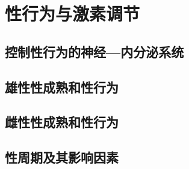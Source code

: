 \chapter{性行为与激素调节}

\section{控制性行为的神经---内分泌系统}

\section{雄性性成熟和性行为}

\section{雌性性成熟和性行为}

\section{性周期及其影响因素}